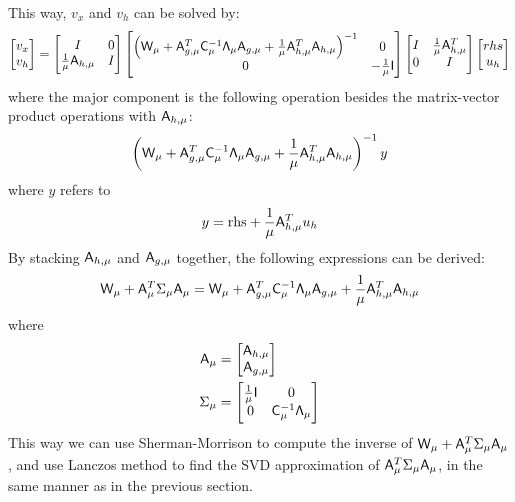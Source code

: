 This way, $v_x$ and $v_h$ can be solved by: 
\begin{equation}\label{eq:core_equ}
\begin{bmatrix} v_x \\ v_h  \end{bmatrix} 
=
\begin{bmatrix}
I & 0 \\
\frac{1}{\mu} \mathsf{A}_{h,\mu}  &  I 
\end{bmatrix}
\begin{bmatrix}
\left(\mathsf{W}_\mu +  \mathsf{A}_{g,\mu}^T  \mathsf{C}_\mu^{-1} \mathsf{\Lambda}_\mu  \mathsf{A}_{g,\mu}  
+ \frac{1}{\mu}  \mathsf{A}_{h,\mu}^T \mathsf{A}_{h,\mu} \right)^{-1}    & 0 \\
0  &  -\frac{1}{\mu}\mathsf{I} 
\end{bmatrix}
\begin{bmatrix}
I  & \frac{1}{\mu} \mathsf{A}_{h,\mu}^T  \\
0  &  I
\end{bmatrix}
\begin{bmatrix}
rhs  \\ u_h
\end{bmatrix}
\end{equation}
where the major component is the following operation besides the matrix-vector product operations with $\mathsf{A}_{h,\mu}$: 
\begin{equation}
\left(\mathsf{W}_\mu +  \mathsf{A}_{g,\mu}^T  \mathsf{C}_\mu^{-1} \mathsf{\Lambda}_\mu  \mathsf{A}_{g,\mu}  
+ \frac{1}{\mu}  \mathsf{A}_{h,\mu}^T \mathsf{A}_{h,\mu} \right)^{-1}  y
\end{equation}
where $y$ refers to 
\begin{equation}
y = \text{rhs} + \frac{1}{\mu} \mathsf{A}_{h,\mu}^T u_h
\end{equation}
By stacking $ \mathsf{A}_{h,\mu} $ and $\mathsf{A}_{g,\mu}$ together, 
the following expressions can be derived: 
\begin{equation}
\mathsf{W}_\mu  +  \mathsf{A}_\mu ^T \Sigma_{\mu} \mathsf{A}_\mu = 
\mathsf{W}_\mu +  \mathsf{A}_{g,\mu}^T  \mathsf{C}_\mu^{-1} \mathsf{\Lambda}_\mu  \mathsf{A}_{g,\mu}  
+ \frac{1}{\mu}  \mathsf{A}_{h,\mu}^T \mathsf{A}_{h,\mu} 
\end{equation}
where 
\begin{equation}
\begin{aligned}
 \mathsf{A}_\mu &= 
 \begin{bmatrix}
 \mathsf{A}_{h,\mu} \\
 \mathsf{A}_{g,\mu}
 \end{bmatrix} \\
  \Sigma_{\mu} &= 
  \begin{bmatrix}  
  \frac{1}{\mu} \mathsf{I}  & 0 \\
  0   &  \mathsf{C}_\mu^{-1} \mathsf{\Lambda}_\mu 
  \end{bmatrix}
 \end{aligned}
\end{equation}
This way we can use Sherman-Morrison to compute the inverse of 
$\mathsf{W}_\mu  +  \mathsf{A}_\mu ^T \Sigma_{\mu} \mathsf{A}_\mu$, and use Lanczos method to find the SVD 
approximation of $\mathsf{A}_\mu ^T \Sigma_{\mu} \mathsf{A}_\mu$, in the same manner as in the previous section. 





